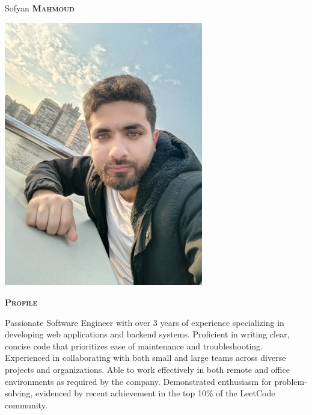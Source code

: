\documentclass[11pt, a4paper]{article}
\newcommand{\headleft}[1]{\vspace*{3ex}\textsc{\textbf{#1}}\par%
    \vspace*{-1.5ex}\hrulefill\par\vspace*{0.7ex}}
\begin{document}
\setlength{\topskip}{0pt}
\setlength{\parindent}{0pt}
\setlength{\parskip}{0pt}
\setlength{\fboxsep}{0pt}
\pagestyle{empty}
\raggedbottom

\begin{minipage}[t]{0.33\textwidth} %
\colorbox{secondColor}{\begin{minipage}[t][5mm][t]{\textwidth}\null\hfill\null\end{minipage}}

\vspace{-.2ex} %
\colorbox{secondColor!90}{\color{white}  %
\textwidth\relax%
\begin{minipage}[t][293mm][t]{0.82\textwidth}
\raggedright
\vspace*{2.5ex}

\Large \centerline{Sofyan \textbf{\textsc{Mahmoud}}} \normalsize 

\null\hfill\includegraphics[width=0.65\textwidth]{avatar.jpeg}\hfill\null

\vspace*{0.5ex} %

\headleft{Profile}
Passionate Software Engineer with over 3 years of experience specializing in developing web applications and backend systems. 
Proficient in writing clear, concise code that prioritizes ease of maintenance and troubleshooting. 
Experienced in collaborating with both small and large teams across diverse projects and organizations. 
Able to work effectively in both remote and office environments as required by the company. 
Demonstrated enthusiasm for problem-solving, evidenced by recent achievement in the top 10\% of the LeetCode community.


\end{minipage}}
\end{minipage}
\end{document}
